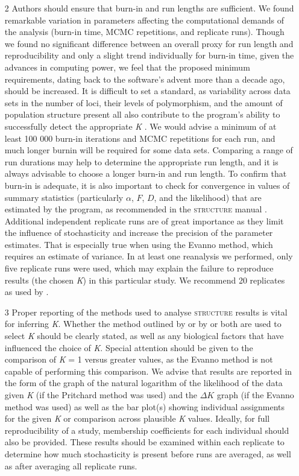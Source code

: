 \begin{itemize}
\item[2] Authors should ensure that burn-in and run lengths are sufficient. We found remarkable variation in 
parameters affecting the computational demands of the analysis (burn-in time, MCMC repetitions, and 
replicate runs). Though we found no significant difference between an overall proxy for run length and 
reproducibility and only a slight trend individually for burn-in time, given the advances in computing 
power, we feel that the proposed minimum requirements, dating back to the software's advent more than a 
decade ago, should be increased. It is difficult to set a standard, as variability across data sets in 
the number of loci, their levels of polymorphism, and the amount of population structure present all 
also contribute to the program's ability to successfully detect the appropriate \emph{K} 
\citep{Rosenberg:2001, Latch:2006, Gao:2007}. We would advise a minimum of at 
least 100 000 burn-in iterations and MCMC repetitions for each run, and much longer burnin will be 
required for some data sets. Comparing a range of run durations may help to determine the appropriate 
run length, and it is always advisable to choose a longer burn-in and run length. To confirm that burn-in 
is adequate, it is also important to check for convergence in values of summary statistics (particularly $\alpha$, 
$F$, $D$, and the likelihood) that are estimated by the program, as recommended in the \textsc{structure} 
manual \citep{Pritchard:2007}. Additional independent replicate runs are of great importance as they 
limit the influence of stochasticity and increase the precision of the parameter estimates. That is 
especially true when using the Evanno method, which requires an estimate of variance. In at least one 
reanalysis we performed, only five replicate runs were used, which may explain the failure to reproduce 
results (the chosen \emph{K}) in this particular study. We recommend 20 replicates as used by \citet{Evanno:2005}.

\item[3] Proper reporting of the methods used to analyse \textsc{structure} results is vital for inferring \emph{K}. 
Whether the method outlined by \citet{Pritchard:2000} or by \citet{Evanno:2005} or both are used to select 
\emph{K} should be clearly stated, as well as any biological factors that have influenced the choice of \emph{K}. 
Special attention should be given to the comparison of \emph{K} = 1 versus greater values, as the Evanno method 
is not capable of performing this comparison. We advise that results are reported in the form of the graph of 
the natural logarithm of the likelihood of the data given \emph{K} (if the Pritchard method was used) and the 
$\Delta K$ graph (if the Evanno method was used) as well as the bar plot(s) showing individual assignments for the given 
\emph{K} or comparison across plausible \emph{K} values. Ideally, for full reproducibility of a study, membership 
coefficients for each individual should also be provided. These results should be examined within each replicate 
to determine how much stochasticity is present before runs are averaged, as well as after averaging all replicate runs.
\end{itemize}

